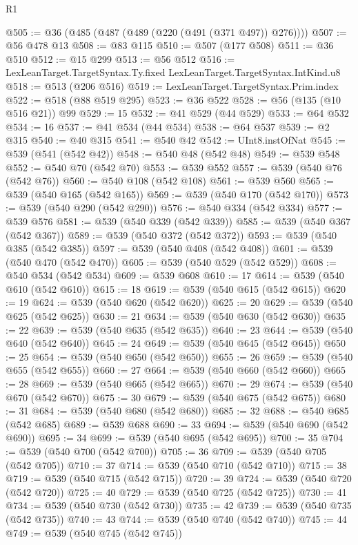 \begin{lexlean}{R1}
\begin{coremodule}
{{{{{{{{{{{{{{{{{{{{{{{{{{{{{{{{{{{{{{{{@505 := @36 (@485 (@487 (@489 (@220 (@491 (@371 @497)) @276))))
@507 := @56 @478 @13
@508 := @83 @115
@510 := @507 (@177 @508)
@511 := @36 @510
@512 := @15 @299
@513 := @56 @512
@516 := LexLeanTarget.TargetSyntax.Ty.fixed LexLeanTarget.TargetSyntax.IntKind.u8
@518 := @513 (@206 @516)
@519 := LexLeanTarget.TargetSyntax.Prim.index
@522 := @518 (@88 @519 @295)
@523 := @36 @522
@528 := @56 (@135 (@10 @516 @21)) @99
@529 := 15
@532 := @41 @529 (@44 @529)
@533 := @64 @532
@534 := 16
@537 := @41 @534 (@44 @534)
@538 := @64 @537
@539 := @2 @315
@540 := @40 @315
@541 := @540 @42
@542 := UInt8.instOfNat
@545 := @539 (@541 (@542 @42))
@548 := @540 @48 (@542 @48)
@549 := @539 @548
@552 := @540 @70 (@542 @70)
@553 := @539 @552
@557 := @539 (@540 @76 (@542 @76))
@560 := @540 @108 (@542 @108)
@561 := @539 @560
@565 := @539 (@540 @165 (@542 @165))
@569 := @539 (@540 @170 (@542 @170))
@573 := @539 (@540 @290 (@542 @290))
@576 := @540 @334 (@542 @334)
@577 := @539 @576
@581 := @539 (@540 @339 (@542 @339))
@585 := @539 (@540 @367 (@542 @367))
@589 := @539 (@540 @372 (@542 @372))
@593 := @539 (@540 @385 (@542 @385))
@597 := @539 (@540 @408 (@542 @408))
@601 := @539 (@540 @470 (@542 @470))
@605 := @539 (@540 @529 (@542 @529))
@608 := @540 @534 (@542 @534)
@609 := @539 @608
@610 := 17
@614 := @539 (@540 @610 (@542 @610))
@615 := 18
@619 := @539 (@540 @615 (@542 @615))
@620 := 19
@624 := @539 (@540 @620 (@542 @620))
@625 := 20
@629 := @539 (@540 @625 (@542 @625))
@630 := 21
@634 := @539 (@540 @630 (@542 @630))
@635 := 22
@639 := @539 (@540 @635 (@542 @635))
@640 := 23
@644 := @539 (@540 @640 (@542 @640))
@645 := 24
@649 := @539 (@540 @645 (@542 @645))
@650 := 25
@654 := @539 (@540 @650 (@542 @650))
@655 := 26
@659 := @539 (@540 @655 (@542 @655))
@660 := 27
@664 := @539 (@540 @660 (@542 @660))
@665 := 28
@669 := @539 (@540 @665 (@542 @665))
@670 := 29
@674 := @539 (@540 @670 (@542 @670))
@675 := 30
@679 := @539 (@540 @675 (@542 @675))
@680 := 31
@684 := @539 (@540 @680 (@542 @680))
@685 := 32
@688 := @540 @685 (@542 @685)
@689 := @539 @688
@690 := 33
@694 := @539 (@540 @690 (@542 @690))
@695 := 34
@699 := @539 (@540 @695 (@542 @695))
@700 := 35
@704 := @539 (@540 @700 (@542 @700))
@705 := 36
@709 := @539 (@540 @705 (@542 @705))
@710 := 37
@714 := @539 (@540 @710 (@542 @710))
@715 := 38
@719 := @539 (@540 @715 (@542 @715))
@720 := 39
@724 := @539 (@540 @720 (@542 @720))
@725 := 40
@729 := @539 (@540 @725 (@542 @725))
@730 := 41
@734 := @539 (@540 @730 (@542 @730))
@735 := 42
@739 := @539 (@540 @735 (@542 @735))
@740 := 43
@744 := @539 (@540 @740 (@542 @740))
@745 := 44
@749 := @539 (@540 @745 (@542 @745))
}}}}}}}}}}}}}}}}}}}}}}}}}}}}}}}}}}}}}}}}
\end{coremodule}
\end{lexlean}
